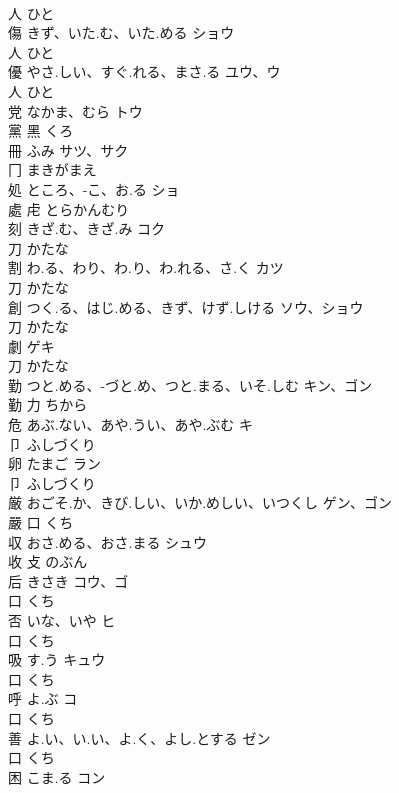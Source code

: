 \documentclass[8pt]{extreport}
\begin{document}
\begin{CJK}{UTF8}{min}
\\	人		ひと		
\\	傷	きず、いた.む、いた.める	ショウ	
\\	人		ひと		
\\	優	やさ.しい、すぐ.れる、まさ.る	ユウ、ウ	
\\	人		ひと		
\\	党	なかま、むら	トウ	
\\	黨	黑		くろ		
\\	冊	ふみ	サツ、サク	
\\	冂		まきがまえ		
\\	処	ところ、-こ、お.る	ショ	
\\	處	虍		とらかんむり		
\\	刻	きざ.む、きざ.み	コク	
\\	刀		かたな		
\\	割	わ.る、わり、わ.り、わ.れる、さ.く	カツ	
\\	刀		かたな		
\\	創	つく.る、はじ.める、きず、けず.しける	ソウ、ショウ	
\\	刀		かたな		
\\	劇		ゲキ	
\\	刀		かたな		
\\	勤	つと.める、-づと.め、つと.まる、いそ.しむ	キン、ゴン	
\\	勤	力		ちから		
\\	危	あぶ.ない、あや.うい、あや.ぶむ	キ	
\\	卩		ふしづくり		
\\	卵	たまご	ラン	
\\	卩		ふしづくり		
\\	厳	おごそ.か、きび.しい、いか.めしい、いつくし	ゲン、ゴン	
\\	嚴	口		くち		
\\	収	おさ.める、おさ.まる	シュウ	
\\	收	攴		のぶん		
\\	后	きさき	コウ、ゴ	
\\	口		くち		
\\	否	いな、いや	ヒ	
\\	口		くち		
\\	吸	す.う	キュウ	
\\	口		くち		
\\	呼	よ.ぶ	コ	
\\	口		くち		
\\	善	よ.い、い.い、よ.く、よし.とする	ゼン	
\\	口		くち		
\\	困	こま.る	コン	

\end{CJK}
\end{document}
